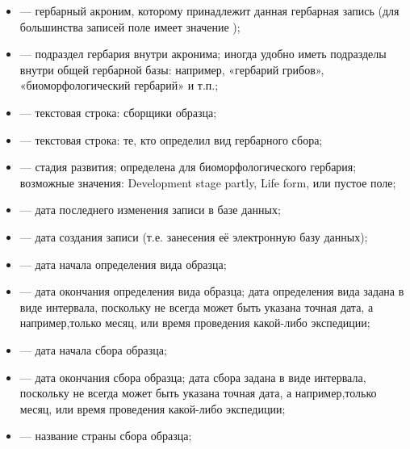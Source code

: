 \documentclass[letterpaper,10pt,russian]{sphinxmanual}
\begin{document}
\begin{itemize}
\item {} 
 — гербарный акроним, которому принадлежит данная гербарная запись (для большинства записей поле имеет значение );

\item {} 
 — подраздел гербария внутри акронима; иногда удобно иметь подразделы внутри общей гербарной базы: например, «гербарий грибов», «биоморфологический гербарий» и т.п.;

\item {} 
 — текстовая строка: сборщики образца;

\item {} 
 — текстовая строка: те, кто определил вид гербарного сбора;

\item {} 
 — стадия развития; определена для биоморфологического гербария; возможные значения: Development stage partly, Life form, или пустое поле;

\item {} 
 — дата последнего изменения записи в базе данных;

\item {} 
 — дата создания записи (т.е. занесения её электронную базу данных);

\item {} 
 — дата начала определения вида образца;

\item {} 
 — дата окончания определения вида образца; дата определения вида задана в виде интервала, поскольку не всегда может быть указана точная дата, а например,только месяц, или время проведения какой-либо экспедиции;

\item {} 
 — дата начала сбора образца;

\item {} 
 — дата окончания сбора образца; дата сбора задана в виде интервала, поскольку не всегда может быть указана точная дата, а например,только месяц, или время проведения какой-либо экспедиции;

\item {} 
 —  название страны сбора образца;


\end{itemize}
\end{document}
